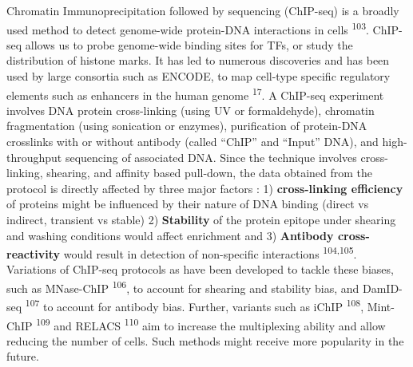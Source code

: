 \documentclass[11pt,twoside]{MPIthesis}
\theoremstyle{definition}
\theoremstyle{definition}
\theoremstyle{definition}
\theoremstyle{remark}
\begin{document}
Chromatin Immunoprecipitation followed by sequencing (ChIP-seq) is a
broadly used method to detect genome-wide protein-DNA interactions in
cells \textsuperscript{103}. ChIP-seq allows us to probe genome-wide
binding sites for TFs, or study the distribution of histone marks. It
has led to numerous discoveries and has been used by large consortia
such as ENCODE, to map cell-type specific regulatory elements such as
enhancers in the human genome \textsuperscript{17}. A ChIP-seq
experiment involves DNA protein cross-linking (using UV or
formaldehyde), chromatin fragmentation (using sonication or enzymes),
purification of protein-DNA crosslinks with or without antibody (called
``ChIP'' and ``Input'' DNA), and high-throughput sequencing of
associated DNA. Since the technique involves cross-linking, shearing,
and affinity based pull-down, the data obtained from the protocol is
directly affected by three major factors : 1) \textbf{cross-linking
efficiency} of proteins might be influenced by their nature of DNA
binding (direct vs indirect, transient vs stable) 2) \textbf{Stability}
of the protein epitope under shearing and washing conditions would
affect enrichment and 3) \textbf{Antibody cross-reactivity} would result
in detection of non-specific interactions \textsuperscript{104,105}.
Variations of ChIP-seq protocols as have been developed to tackle these
biases, such as MNase-ChIP \textsuperscript{106}, to account for
shearing and stability bias, and DamID-seq \textsuperscript{107} to
account for antibody bias. Further, variants such as iChIP
\textsuperscript{108}, Mint-ChIP \textsuperscript{109} and RELACS
\textsuperscript{110} aim to increase the multiplexing ability and allow
reducing the number of cells. Such methods might receive more popularity
in the future.
\end{document}
